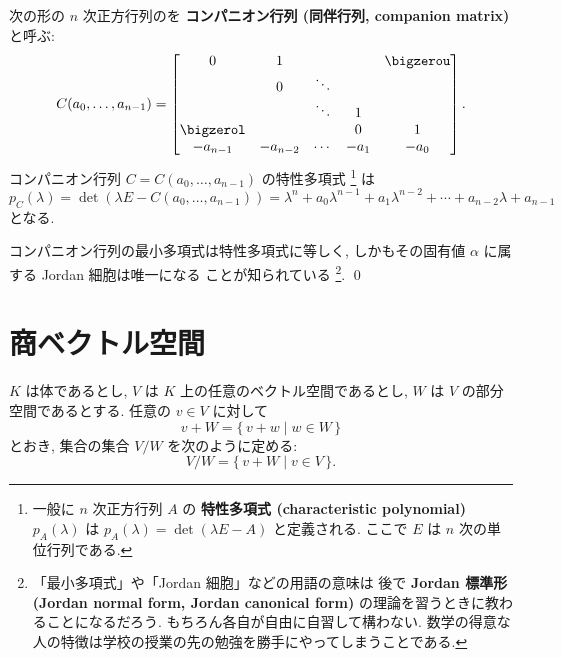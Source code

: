 \documentclass[12pt,twoside]{jarticle}
\begin{document}
\begin{guide}[コンパニオン行列]
  \label{guide:companion-matrix}
  次の形の $n$ 次正方行列のを {\bf コンパニオン行列 (同伴行列, 
  companion matrix)} と呼ぶ:
  \begin{equation*}
    C(a_0,\dots,a_{n-1}) =
    \begin{bmatrix}
      0         &    1     &        &      & \bigzerou \\
                &    0     & \ddots &      & \\
                &          & \ddots &  1   & \\
      \bigzerol &          &        &  0   &  1 \\
      -a_{n-1}  & -a_{n-2} & \cdots & -a_1 & -a_0 \\
    \end{bmatrix}.
  \end{equation*}
  コンパニオン行列 $C = C(a_0,\dots,a_{n-1})$ の特性多項式%
  \footnote{一般に $n$ 次正方行列 $A$ の
    {\bf 特性多項式 (characteristic polynomial)} $p_A(\lambda)$ 
    は $p_A(\lambda)=\det(\lambda E - A)$ と定義される.
    ここで $E$ は $n$ 次の単位行列である.}%
  は
  \begin{equation*}
    p_C(\lambda)
    = \det(\lambda E - C(a_0,\ldots,a_{n-1}))
    = \lambda^n + a_0\lambda^{n-1} + a_1\lambda^{n-2}
    + \cdots + a_{n-2}\lambda + a_{n-1}
  \end{equation*}
  となる. %
  
  コンパニオン行列の最小多項式は特性多項式に等しく,
  しかもその固有値 $\alpha$ に属する Jordan 細胞は唯一になる
  ことが知られている%
  \footnote{「最小多項式」や「Jordan 細胞」などの用語の意味は
    後で {\bf Jordan 標準形 (Jordan normal form, Jordan canonical form)} 
    の理論を習うときに教わることになるだろう.
    もちろん各自が自由に自習して構わない.
    数学の得意な人の特徴は学校の授業の先の勉強を勝手にやってしまうことである.}.
  \qed
\end{guide}


\section{商ベクトル空間}
\label{sec:quotient-vector-space}

$K$ は体であるとし, $V$ は $K$ 上の任意のベクトル空間であるとし, 
$W$ は $V$ の部分空間であるとする.  任意の $v\in V$ に対して
\begin{equation*}
  v + W = \{\, v+w \mid w\in W \,\}
\end{equation*}
とおき, 集合の集合 $V/W$ を次のように定める:
\begin{equation*}
  V/W = \{\, v+W \mid v \in V \,\}.
\end{equation*}
\end{document}
